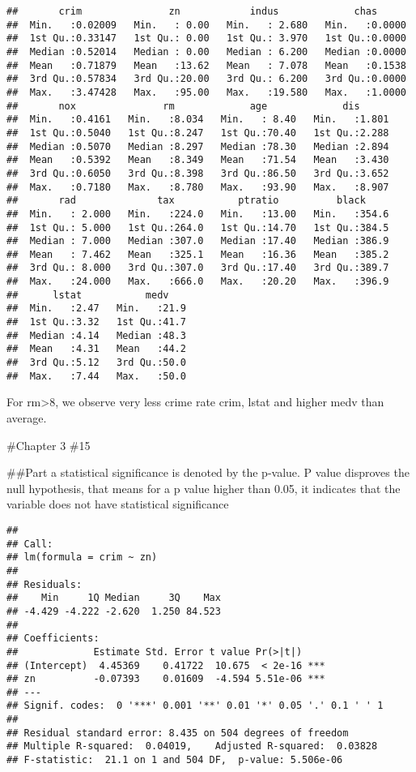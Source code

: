 \documentclass[
]{article}
\begin{document}
\begin{verbatim}
##       crim               zn            indus             chas       
##  Min.   :0.02009   Min.   : 0.00   Min.   : 2.680   Min.   :0.0000  
##  1st Qu.:0.33147   1st Qu.: 0.00   1st Qu.: 3.970   1st Qu.:0.0000  
##  Median :0.52014   Median : 0.00   Median : 6.200   Median :0.0000  
##  Mean   :0.71879   Mean   :13.62   Mean   : 7.078   Mean   :0.1538  
##  3rd Qu.:0.57834   3rd Qu.:20.00   3rd Qu.: 6.200   3rd Qu.:0.0000  
##  Max.   :3.47428   Max.   :95.00   Max.   :19.580   Max.   :1.0000  
##       nox               rm             age             dis       
##  Min.   :0.4161   Min.   :8.034   Min.   : 8.40   Min.   :1.801  
##  1st Qu.:0.5040   1st Qu.:8.247   1st Qu.:70.40   1st Qu.:2.288  
##  Median :0.5070   Median :8.297   Median :78.30   Median :2.894  
##  Mean   :0.5392   Mean   :8.349   Mean   :71.54   Mean   :3.430  
##  3rd Qu.:0.6050   3rd Qu.:8.398   3rd Qu.:86.50   3rd Qu.:3.652  
##  Max.   :0.7180   Max.   :8.780   Max.   :93.90   Max.   :8.907  
##       rad              tax           ptratio          black      
##  Min.   : 2.000   Min.   :224.0   Min.   :13.00   Min.   :354.6  
##  1st Qu.: 5.000   1st Qu.:264.0   1st Qu.:14.70   1st Qu.:384.5  
##  Median : 7.000   Median :307.0   Median :17.40   Median :386.9  
##  Mean   : 7.462   Mean   :325.1   Mean   :16.36   Mean   :385.2  
##  3rd Qu.: 8.000   3rd Qu.:307.0   3rd Qu.:17.40   3rd Qu.:389.7  
##  Max.   :24.000   Max.   :666.0   Max.   :20.20   Max.   :396.9  
##      lstat           medv     
##  Min.   :2.47   Min.   :21.9  
##  1st Qu.:3.32   1st Qu.:41.7  
##  Median :4.14   Median :48.3  
##  Mean   :4.31   Mean   :44.2  
##  3rd Qu.:5.12   3rd Qu.:50.0  
##  Max.   :7.44   Max.   :50.0
\end{verbatim}

For rm\textgreater8, we observe very less crime rate crim, lstat and
higher medv than average.

\#Chapter 3 \#15

\#\#Part a statistical significance is denoted by the p-value. P value
disproves the null hypothesis, that means for a p value higher than
0.05, it indicates that the variable does not have statistical
significance

\begin{verbatim}
## 
## Call:
## lm(formula = crim ~ zn)
## 
## Residuals:
##    Min     1Q Median     3Q    Max 
## -4.429 -4.222 -2.620  1.250 84.523 
## 
## Coefficients:
##             Estimate Std. Error t value Pr(>|t|)    
## (Intercept)  4.45369    0.41722  10.675  < 2e-16 ***
## zn          -0.07393    0.01609  -4.594 5.51e-06 ***
## ---
## Signif. codes:  0 '***' 0.001 '**' 0.01 '*' 0.05 '.' 0.1 ' ' 1
## 
## Residual standard error: 8.435 on 504 degrees of freedom
## Multiple R-squared:  0.04019,    Adjusted R-squared:  0.03828 
## F-statistic:  21.1 on 1 and 504 DF,  p-value: 5.506e-06
\end{verbatim}
\end{document}
